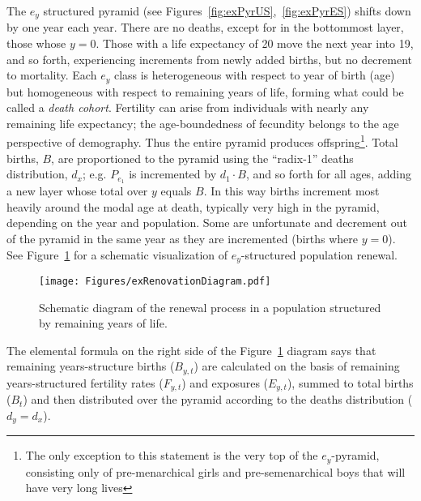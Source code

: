  \FloatBarrier
\label{sec:exrenewal}
The $e_y$ structured pyramid (see Figures~\ref{fig:exPyrUS},~\ref{fig:exPyrES})
shifts down by one year each year. There are no deaths, except for in 
the bottommost layer, those whose $y = 0$. Those with a life
expectancy of 20 move the next year into 19, and so forth, experiencing
increments from newly added births, but no decrement to mortality. 
Each $e_y$ class is heterogeneous with 
respect to year of birth (age) but homogeneous with respect to remaining 
years of life, forming what could be called a \textit{death cohort}. Fertility
can arise from individuals with nearly any remaining life expectancy; the 
age-boundedness of fecundity belongs to the age
perspective of demography. Thus the entire pyramid produces 
offspring\footnote{The only exception
to this statement is the very top of the $e_y$-pyramid, consisting only of
pre-menarchical girls and pre-semenarchical boys that will have very long
lives}. Total births, $B$, are proportioned to the pyramid using the ``radix-1''
deaths distribution, $d_x$; e.g. $P_{e_1}$ is incremented by $d_1 \cdot B$, and
so forth for all ages, adding a new layer whose total over $y$ equals $B$. In 
this way births
increment most heavily around the modal age at death, typically very high in the
pyramid, depending on the year and population. Some are
unfortunate and decrement out of the pyramid in the same year as they are
incremented (births where $y = 0$). See Figure~\ref{fig:exrenewal} for a
schematic visualization of $e_y$-structured population renewal.

\begin{figure}[ht!]
\begin{adjustwidth}{-1in}{1in}
        \centering  
          \caption{Schematic diagram of the renewal process in a population
          structured by remaining years of life.}
           \texttt{[image: Figures/exRenovationDiagram.pdf]}
          \label{fig:exrenewal}
          \end{adjustwidth}
\end{figure}

The elemental formula on the right side of the Figure~\ref{fig:exrenewal}
diagram says that remaining years-structure births ($B_{y,t}$) are calculated on
the basis of remaining years-structured fertility rates ($F_{y,t}$) and
exposures ($E_{y,t}$), summed to total births ($B_t$) and then distributed over
the pyramid according to the deaths distribution ($d_y = d_x$).
